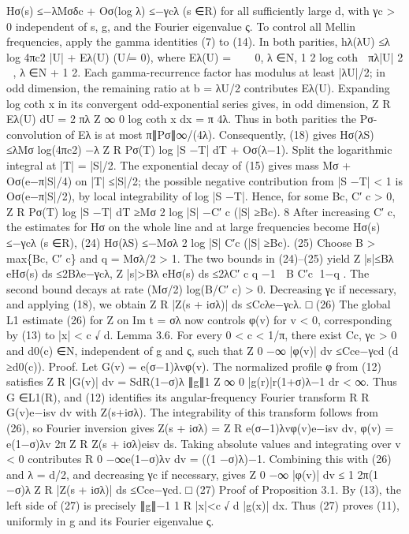 Hσ(s) ≤−λMσδc + Oσ(log λ) ≤−γcλ
(s ∈R)
for all suﬃciently large d, with γc > 0 independent of s, g, and the Fourier eigenvalue ς.
To control all Mellin frequencies, apply the gamma identities (7) to (14). In both parities,
hλ(λU) ≤λ log 4πc2
|U| + Eλ(U)
(U ̸= 0),
where
Eλ(U) =



0,
λ ∈N,
1
2 log coth
 πλ|U|
2

,
λ ∈N + 1
2.
Each gamma-recurrence factor has modulus at least |λU|/2; in odd dimension, the remaining
ratio at b = λU/2 contributes Eλ(U). Expanding log coth x in its convergent odd-exponential
series gives, in odd dimension,
Z
R
Eλ(U) dU = 2
πλ
Z ∞
0
log coth x dx = π
4λ.
Thus in both parities the Pσ-convolution of Eλ is at most π∥Pσ∥∞/(4λ). Consequently, (18)
gives
Hσ(λS) ≤λMσ log(4πc2) −λ
Z
R
Pσ(T) log |S −T| dT + Oσ(λ−1).
Split the logarithmic integral at |T| = |S|/2. The exponential decay of (15) gives mass Mσ +
Oσ(e−π|S|/4) on |T| ≤|S|/2; the possible negative contribution from |S −T| < 1 is Oσ(e−π|S|/2),
by local integrability of log |S −T|. Hence, for some Bc, C′
c > 0,
Z
R
Pσ(T) log |S −T| dT ≥Mσ
2 log |S| −C′
c
(|S| ≥Bc).
8
After increasing C′
c, the estimates for Hσ on the whole line and at large frequencies become
Hσ(s) ≤−γcλ
(s ∈R),
(24)
Hσ(λS) ≤−Mσλ
2
log |S|
C′c
(|S| ≥Bc).
(25)
Choose B > max\{Bc, C′
c\} and q = Mσλ/2 > 1. The two bounds in (24)–(25) yield
Z
|s|≤Bλ
eHσ(s) ds ≤2Bλe−γcλ,
Z
|s|>Bλ
eHσ(s) ds ≤2λC′
c
q −1
 B
C′c
1−q
.
The second bound decays at rate (Mσ/2) log(B/C′
c) > 0.
Decreasing γc if necessary, and
applying (18), we obtain
Z
R
|Z(s + iσλ)| ds ≤Ccλe−γcλ.
□
(26)
The global L1 estimate (26) for Z on Im t = σλ now controls φ(v) for v < 0, corresponding
by (13) to |x| < c
√
d.
Lemma 3.6. For every 0 < c < 1/π, there exist Cc, γc > 0 and d0(c) ∈N, independent of g
and ς, such that
Z 0
−∞
|φ(v)| dv ≤Cce−γcd
(d ≥d0(c)).
Proof. Let G(v) = e(σ−1)λvφ(v). The normalized proﬁle φ from (12) satisﬁes
Z
R
|G(v)| dv = SdR(1−σ)λ
∥g∥1
Z ∞
0
|g(r)|r(1+σ)λ−1 dr < ∞.
Thus G ∈L1(R), and (12) identiﬁes its angular-frequency Fourier transform
R
R G(v)e−isv dv
with Z(s+iσλ). The integrability of this transform follows from (26), so Fourier inversion gives
Z(s + iσλ) =
Z
R
e(σ−1)λvφ(v)e−isv dv,
φ(v) = e(1−σ)λv
2π
Z
R
Z(s + iσλ)eisv ds.
Taking absolute values and integrating over v < 0 contributes
R 0
−∞e(1−σ)λv dv = ((1 −σ)λ)−1.
Combining this with (26) and λ = d/2, and decreasing γc if necessary, gives
Z 0
−∞
|φ(v)| dv ≤
1
2π(1 −σ)λ
Z
R
|Z(s + iσλ)| ds ≤Cce−γcd.
□
(27)
Proof of Proposition 3.1. By (13), the left side of (27) is precisely ∥g∥−1
1
R
|x|<c
√
d |g(x)| dx. Thus
(27) proves (11), uniformly in g and its Fourier eigenvalue ς.
